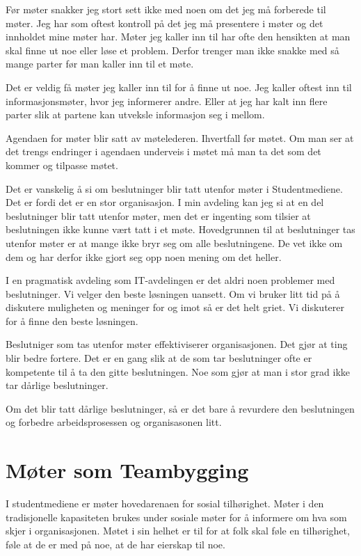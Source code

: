 \documentclass[12pt, a4paper]{article}
\begin{document}
Før møter snakker jeg stort sett ikke med noen om det jeg må forberede til
møter. Jeg har som oftest kontroll på det jeg må presentere i møter og det
innholdet mine møter har. Møter jeg kaller inn til har ofte den hensikten at
man skal finne ut noe eller løse et problem. Derfor trenger man ikke snakke med
så mange parter før man kaller inn til et møte. 

Det er veldig få møter jeg kaller inn til for å finne ut noe. Jeg kaller oftest
inn til informasjonsmøter, hvor jeg informerer andre. Eller at jeg har kalt inn
flere parter slik at partene kan utveksle informasjon seg i mellom. 

Agendaen for møter blir satt av møtelederen. Ihvertfall før møtet. Om man ser
at det trengs endringer i agendaen underveis i møtet må man ta det som det
kommer og tilpasse møtet.

Det er vanskelig å si om beslutninger blir tatt utenfor møter i Studentmediene.
Det er fordi det er en stor organisasjon. I min avdeling kan jeg si at en del
beslutninger blir tatt utenfor møter, men det er ingenting som tilsier at
beslutningen ikke kunne vært tatt i et møte. Hovedgrunnen til at beslutninger
tas utenfor møter er at mange ikke bryr seg om alle beslutningene. De vet ikke
om dem og har derfor ikke gjort seg opp noen mening om det heller. 

I en pragmatisk avdeling som IT-avdelingen er det aldri noen problemer med
beslutninger. Vi velger den beste løsningen uansett. Om vi bruker litt tid på å
diskutere muligheten og meninger for og imot så er det helt griet. Vi
diskuterer for å finne den beste løsningen. 

Beslutniger som tas utenfor møter effektiviserer organisasjonen. Det gjør at
ting blir bedre fortere. Det er en gang slik at de som tar beslutninger ofte er
kompetente til å ta den gitte beslutningen. Noe som gjør at man i stor grad
ikke tar dårlige beslutninger. 

Om det blir tatt dårlige beslutninger, så er det bare å revurdere den
beslutningen og forbedre arbeidsprosessen og organisasonen litt. 

\section{Møter som Teambygging}
I studentmediene er møter hovedarenaen for sosial tilhørighet. Møter  i den
tradisjonelle kapasiteten brukes under sosiale møter for å informere om hva som
skjer i organisasjonen. Møtet i sin helhet er til for at folk skal føle en
tilhørighet, føle at de er med på noe, at de har eierskap til noe. 
\end{document}
